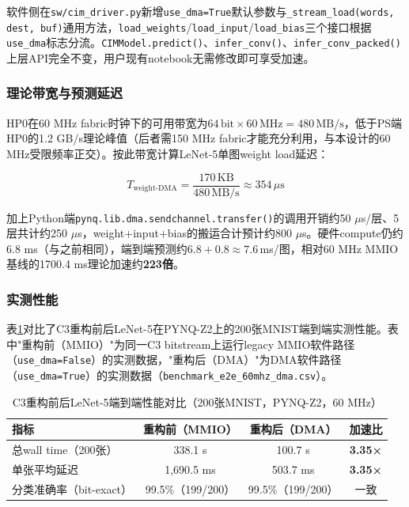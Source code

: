 \documentclass[12pt, a4paper]{article}
\begin{document}
软件侧在\texttt{sw/cim\_driver.py}新增\texttt{use\_dma=True}默认参数与\texttt{\_stream\_load(words, dest, buf)}通用方法，\texttt{load\_weights}/\texttt{load\_input}/\texttt{load\_bias}三个接口根据\texttt{use\_dma}标志分流。\texttt{CIMModel.predict()}、\texttt{infer\_conv()}、\texttt{infer\_conv\_packed()}上层API完全不变，用户现有notebook无需修改即可享受加速。

\subsubsection{理论带宽与预测延迟}

HP0在60 MHz fabric时钟下的可用带宽为$64\,\text{bit} \times 60\,\text{MHz} = 480\,\text{MB/s}$，低于PS端HP0的1.2 GB/s理论峰值（后者需150 MHz fabric才能充分利用，与本设计的60 MHz受限频率正交）。按此带宽计算LeNet-5单图weight load延迟：

\begin{equation}
    T_{\text{weight-DMA}} = \frac{170\,\text{KB}}{480\,\text{MB/s}} \approx 354\,\mu\text{s}
\end{equation}

加上Python端\texttt{pynq.lib.dma.sendchannel.transfer()}的调用开销约50 $\mu$s/层、5层共计约250 $\mu$s，weight+input+bias的搬运合计预计约800 $\mu$s。硬件compute仍约6.8 ms（与之前相同），端到端预测约$6.8 + 0.8 \approx 7.6\,$ms/图，相对60 MHz MMIO基线的1700.4 ms理论加速约\textbf{223倍}。

\subsubsection{实测性能}
\label{sec:c3_benchmark}

表\ref{tab:c3_benchmark}对比了C3重构前后LeNet-5在PYNQ-Z2上的200张MNIST端到端实测性能。表中"重构前（MMIO）"为同一C3 bitstream上运行legacy MMIO软件路径（\texttt{use\_dma=False}）的实测数据，"重构后（DMA）"为DMA软件路径（\texttt{use\_dma=True}）的实测数据（\texttt{benchmark\_e2e\_60mhz\_dma.csv}）。

\begin{table}[H]
    \centering
    \caption{C3重构前后LeNet-5端到端性能对比（200张MNIST，PYNQ-Z2，60 MHz）}
    \label{tab:c3_benchmark}
    \begin{tabular}{lccc}
        \toprule
        指标 & 重构前（MMIO） & 重构后（DMA）& 加速比 \\
        \midrule
        总wall time（200张） & 338.1 s & 100.7 s & \textbf{3.35×} \\
        单张平均延迟 & 1,690.5 ms & 503.7 ms & \textbf{3.35×} \\
        分类准确率（bit-exact） & 99.5\%（199/200） & 99.5\%（199/200） & 一致 \\
        \bottomrule
    \end{tabular}
\end{table}
\end{document}
